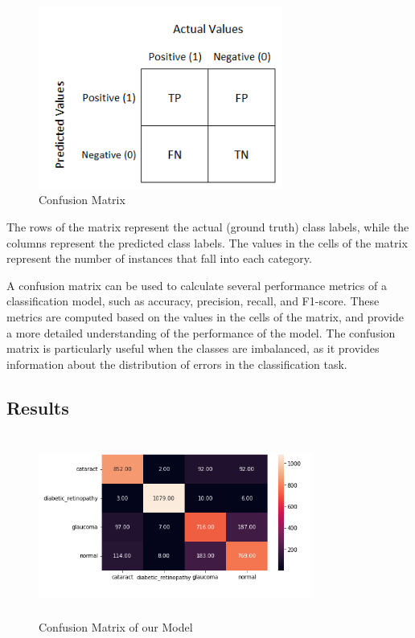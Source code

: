 \documentclass[conference]{IEEEtran}
\begin{document}
\begin{figure}[ht]
    \centering
    \includegraphics[width=8cm, height = 6cm]{Images/Confusion Matrix Example.png}
    \caption{Confusion Matrix}
    \label{Confusion Matrix}
\end{figure}

\vspace{5pt}
The rows of the matrix represent the actual (ground truth) class labels, while the columns represent the predicted class labels. The values in the cells of the matrix represent the number of instances that fall into each category.

\vspace{5pt}
A confusion matrix can be used to calculate several performance metrics of a classification model, such as accuracy, precision, recall, and F1-score. These metrics are computed based on the values in the cells of the matrix, and provide a more detailed understanding of the performance of the model. The confusion matrix is particularly useful when the classes are imbalanced, as it provides information about the distribution of errors in the classification task.

\subsection{Results}

\begin{figure}[ht]
    \centering
    \includegraphics[width=9cm, height = 6cm]{Images/Confusion Matrix.png}
    \caption{Confusion Matrix of our Model}
    \label{Confusion Matrix of our Model}
\end{figure}
\end{document}
